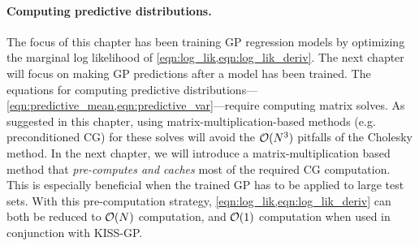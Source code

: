 \paragraph{Computing predictive distributions.}
The focus of this chapter has been training GP regression models by optimizing the marginal log likelihood of \cref{eqn:log_lik,eqn:log_lik_deriv}.
The next chapter will focus on making GP predictions after a model has been trained.
The equations for computing predictive distributions---\cref{eqn:predictive_mean,eqn:predictive_var}---require computing matrix solves.
As suggested in this chapter, using matrix-multiplication-based methods (e.g. preconditioned CG) for these solves will avoid the $\bigo{N^3}$ pitfalls of the Cholesky method.
In the next chapter, we will introduce a matrix-multiplication based method that \emph{pre-computes and caches} most of the required CG computation.
This is especially beneficial when the trained GP has to be applied to large test sets.
With this pre-computation strategy, \cref{eqn:log_lik,eqn:log_lik_deriv} can both be reduced to $\bigo{N}$ computation, and $\bigo{1}$ computation when used in conjunction with KISS-GP.
